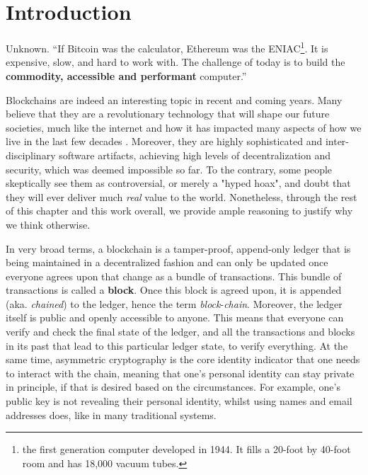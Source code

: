 \chapter{Introduction} \label{chap:intoroduction}

\begin{chapquote}{Unknown.}
``If Bitcoin was the calculator, Ethereum was the ENIAC\footnote{the first generation computer
developed in 1944. It fills a 20-foot by 40-foot room and has 18,000 vacuum tubes.}. It is
expensive, slow, and hard to work with. The challenge of today is to build the \textbf{commodity,
accessible and performant} computer.''
\end{chapquote}

Blockchains are indeed an interesting topic in recent and coming years. Many believe that they are a
revolutionary technology that will shape our future societies, much like the internet and how it has
impacted many aspects of how we live in the last few decades \cite{pirrongWillBlockchainBe2019}.
Moreover, they are highly sophisticated and inter-disciplinary software artifacts, achieving high
levels of decentralization and security, which was deemed impossible so far. To the contrary, some
people skeptically see them as controversial, or merely a "hyped hoax", and doubt that they will
ever deliver much \textit{real} value to the world. Nonetheless, through the rest of this chapter
and this work overall, we provide ample reasoning to justify why we think otherwise.

In very broad terms, a blockchain is a tamper-proof, append-only ledger that is being maintained in
a decentralized fashion and can only be updated once everyone agrees upon that change as a bundle
of transactions. This bundle of transactions is called a \textbf{block}. Once this block is agreed
upon, it is appended (aka. \textit{chained}) to the ledger, hence the term
\textit{block}-\textit{chain}. Moreover, the ledger itself is public and openly accessible to
anyone. This means that everyone can verify and check the final state of the ledger, and all the
transactions and blocks in its past that lead to this particular ledger state, to verify everything.
At the same time, asymmetric cryptography is the core identity indicator that one needs to interact
with the chain, meaning that one's personal identity can stay private in principle, if that is
desired based on the circumstances. For example, one's public key is not revealing their personal
identity, whilst using names and email addresses does, like in many traditional systems.

